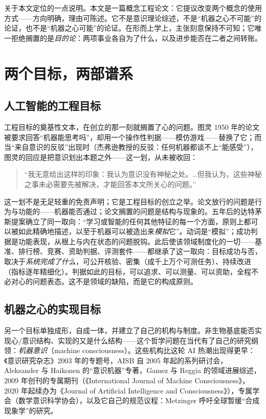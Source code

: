 \documentclass[10pt,fontset=fandol]{ctexart}
\begin{document}
关于本文定位的一点说明。本文是一篇概念工程论文\cite{cappelen2018fixing}：它提议改变两个概念的使用方式——方向明确，理由可陈述。它不是意识理论综述，不是“机器之心不可能”的论证，也不是“机器之心可能”的论证。在形而上学上，主张刻意保持不可知；它唯一拒绝搁置的是\emph{目的论}：两项事业各自为了什么，以及进步能否在二者之间转账。

\section{两个目标，两部谱系}\label{sec:genealogy}

\subsection{人工智能的工程目标}\label{sec:genealogyai}

工程目标的奠基性文本，在创立的那一刻就搁置了心的问题。图灵 1950 年的论文被要求回答“机器能思考吗”，却用一个操作性判据——模仿游戏——替换了它；而当“来自意识的反驳”出现时（杰弗逊教授的反驳：任何机器都谈不上“能感受”），图灵的回应是把意识划出本题之外——这一划，从未被收回：

\begin{quote}“我无意给出这样的印象：我认为意识没有神秘之处。\dots{}但我认为，这些神秘之事未必需要先被解决，才能回答本文所关心的问题。”\end{quote}

这一划不是无足轻重的免责声明；它是工程目标的创立之举。论文放行的问题是行为与功能的——机器能否通过；论文搁置的问题是结构与现象的。五年后的达特茅斯提案确立了同一取向：“学习或智能的任何其他特征的每一个方面，原则上都可以被如此精确地描述，以至于机器可以被造出来\emph{模拟}它”\cite{mccarthy1955proposal}。动词是“模拟”；成功判据是功能表现，从根上与内在状态的问题脱钩。此后使该领域制度化的一切——基准、排行榜、竞赛、资助判据、评测套件——都继承了这一取向：目标成功与否，取决于\emph{系统完成了什么}，可公开核验、密集（成千上万个可测任务）、持续改进（指标逐年精细化）。判据如此的目标，可以追求、可以测量、可以资助，全程不必对心的问题表态。这不是领域的缺陷，而是它的构成原则。

\subsection{机器之心的实现目标}\label{sec:genealogymc}

另一个目标单独成形，自成一体，并建立了自己的机构与制度。非生物基底能否实现心/意识结构、实现的又是什么结构——这个哲学问题在当代有了自己的研究纲领：\emph{机器意识}（machine consciousness）。这些机构比这轮 AI 热潮出现得更早：《意识研究杂志》2003 年的专题号\cite{holland2003machine}，AISB 自 2005 年起的系列研讨会，Aleksander 与 Haikonen 的“意识机器”专著\cite{aleksander1996impossible,haikonen2003cognitive}，Gamez 与 Reggia 的领域进展综述\cite{gamez2008progress,reggia2013rise}，2009 年创刊的专属期刊（《International Journal of Machine Consciousness》，2020 年起续办为《Journal of Artificial Intelligence and Consciousness》\cite{jaic2020}），专属学会（数学意识科学协会\cite{amcs2023letter}），以及它自己的规范议程：Metzinger 呼吁全球暂缓“合成现象学”的研究\cite{metzinger2021artificial}。
\end{document}
